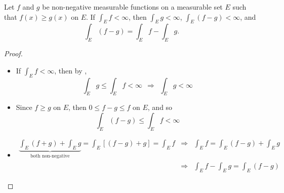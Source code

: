 \begin{pblm}\label{p:nonnegmeas_infty}%
	Let $f$ and $g$ be non-negative measurable functions on a measurable set $E$ such that 
	$f(x) \ge g(x)$ on $E$. If $\int_E f < \infty$, then $\int_E g < \infty$, 
	$\int_E(f-g) < \infty$, and 
	\begin{equation*}
		\int_E(f-g) = \int_Ef - \int_Eg. 
	\end{equation*}
\begin{proof}~
	\begin{itemize}
	\item If $\int_E f < \infty$, then by , 
		\begin{equation*}
			\int_Eg \le \int_E f < \infty ~~ \Rightarrow ~~ \int_Eg < \infty
		\end{equation*}
	\item Since $f \ge g$ on $E$, then $0 \le f - g \le f$ on $E$, and so 
		\begin{equation*}
			\int_E (f - g) \le \int_E f < \infty
		\end{equation*}
	\item 
		\begin{equation*}
		\begin{array}{rcl}
			\underbrace{\int_E (f + g) + \int_Eg}_{\text{both non-negative}} = 
			\int_E\left[(f - g) + g\right] = \int_Ef & \Rightarrow & \int_Ef = 
			\int_E(f-g)+\int_Eg\\
			& \Rightarrow & \int_Ef - \int_Eg = \int_E(f - g)
		\end{array}
		\end{equation*}
	\end{itemize}
\end{proof}
\end{pblm}

